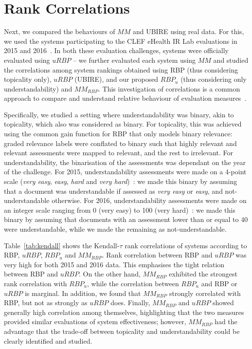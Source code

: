 



\section{Rank Correlations} %
\label{sec:clef}
Next, we compared the behaviours of $MM$ and UBIRE using real data. For this, we used the systems participating to the CLEF eHealth IR Lab evaluations in 2015 and 2016~\cite{clefIR15,clefIR16}. In both these evaluation challenges, systems were officially evaluated using $uRBP$ -- we further evaluated each system using $MM$ and studied the correlations among system rankings obtained using RBP (thus considering topicality only), $uRBP$ (UBIRE), and our proposed $RBP_u$ (thus considering only understandability) and $MM_{RBP}$. This investigation of correlations is a common approach to compare and understand relative behaviour of evaluation measures~\cite{zuccon16}. 

Specifically, we studied a setting where understandability was binary, akin to topicality, which also was considered as binary. For topicality, this was achieved using the common gain function for RBP that only models binary relevance: graded relevance labels were conflated to binary such that highly relevant and relevant assessments were mapped to relevant, and the rest to irrelevant. For understandability, the binarisation of the assessments was dependant on the year of the challenge. For 2015, understandability assessments were made on a 4-point scale (\textit{very easy}, \textit{easy}, \textit{hard} and \textit{very hard})~\cite{clefIR15}: we made this binary by assuming that a document was understandable if assessed as \textit{very easy} or \textit{easy}, and not-understandable otherwise. For 2016, understandability assessments were made on an integer scale ranging from 0 (very easy) to 100 (very hard)~\cite{clefIR16}: we made this binary by assuming that documents with an assessment lower than or equal to 40 were understandable, while we made the remaining as not-understandable. 

Table~\ref{tab:kendall} shows the Kendall-$\tau$ rank correlations of systems according to RBP, $uRBP$, $RBP_u$ and $MM_{RBP}$. Rank correlation between RBP and $uRBP$ was very high for both 2015 and 2016 data. This emphasises the tight relation between RBP and $uRBP$. On the other hand, $MM_{RBP}$ exhibited the strongest rank correlation with $RBP_u$, while the correlation between $RBP_u$ and RBP or $uRBP$ is marginal. In addition, we found that $MM_{RBP}$ strongly correlated with RBP, but not as strongly as  $uRBP$ does. Finally, $MM_{RBP}$ and $uRBP$ showed generally high correlation among themselves, highlighting that the two measures provided similar evaluations of system effectiveness; however, $MM_{RBP}$ had the advantage that the trade-off between topicality and understandability could be clearly identified and studied. 

